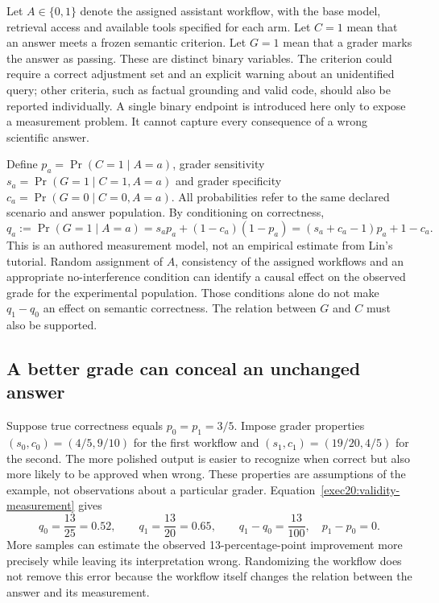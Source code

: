 Let $A\in\{0,1\}$ denote the assigned assistant workflow, with the base model,
retrieval access and available tools specified for each arm. Let $C=1$ mean that
an answer meets a frozen semantic criterion. Let $G=1$ mean that a grader marks
the answer as passing. These are distinct binary variables. The criterion
could require a correct adjustment set and an explicit warning about an
unidentified query; other criteria, such as factual grounding and valid code,
should also be reported individually. A single binary endpoint is introduced
here only to expose a measurement problem. It cannot capture every consequence
of a wrong scientific answer.

Define $p_a=\Pr(C=1\mid A=a)$, grader sensitivity
$s_a=\Pr(G=1\mid C=1,A=a)$ and grader specificity
$c_a=\Pr(G=0\mid C=0,A=a)$. All probabilities refer to the same declared
scenario and answer population. By conditioning on correctness,
\begin{equation}
 q_a:=\Pr(G=1\mid A=a)
 =s_a p_a+(1-c_a)(1-p_a)
 =(s_a+c_a-1)p_a+1-c_a .
 \label{exec20:validity-measurement}
\end{equation}
This is an authored measurement model, not an empirical estimate from Lin's
tutorial. Random assignment of $A$, consistency of the assigned workflows and
an appropriate no-interference condition can identify a causal effect on the
observed grade for the experimental population. Those conditions alone do not
make $q_1-q_0$ an effect on semantic correctness. The relation between $G$ and
$C$ must also be supported. \citep{exec20_validity_reference}

\subsection{A better grade can conceal an unchanged answer}
\label{exec20:validity-example}

Suppose true correctness equals $p_0=p_1=3/5$. Impose grader properties
$(s_0,c_0)=(4/5,9/10)$ for the first workflow and
$(s_1,c_1)=(19/20,4/5)$ for the second. The more polished output is easier to
recognize when correct but also more likely to be approved when wrong. These
properties are assumptions of the example, not observations about a particular
grader. Equation~\eqref{exec20:validity-measurement} gives
\begin{equation}
 q_0=\frac{13}{25}=0.52,\qquad
 q_1=\frac{13}{20}=0.65,\qquad
 q_1-q_0=\frac{13}{100},\quad p_1-p_0=0.
 \label{exec20:validity-illusion}
\end{equation}
More samples can estimate the observed 13-percentage-point improvement more
precisely while leaving its interpretation wrong. Randomizing the workflow
does not remove this error because the workflow itself changes the relation
between the answer and its measurement.

